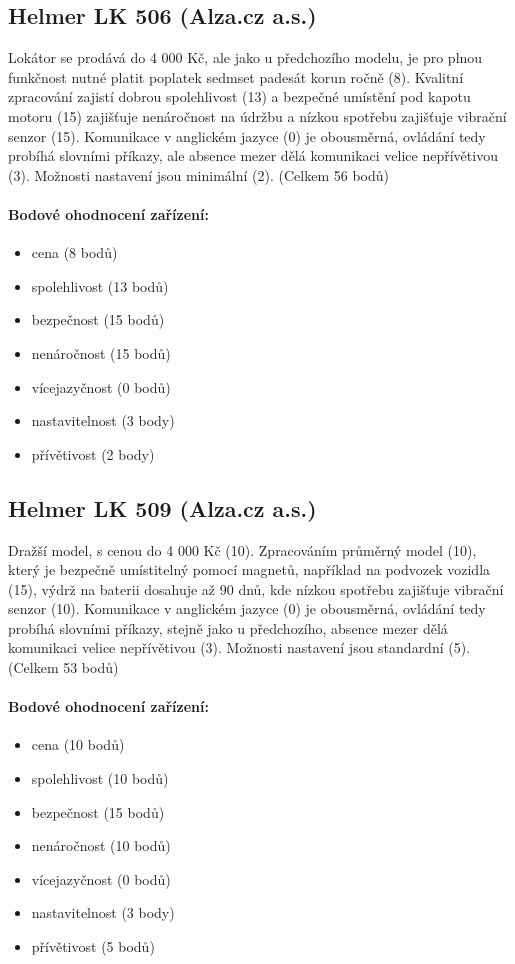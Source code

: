 \documentclass[FM,BP]{tulthesis}  %
\begin{document}
\subsection{Helmer LK 506 (Alza.cz a.s.)}
Lokátor se prodává do 4 000 Kč, ale jako u předchozího modelu, je pro plnou funkčnost nutné platit poplatek sedmset padesát korun ročně (8). Kvalitní zpracování zajistí dobrou spolehlivost (13) a bezpečné umístění pod kapotu motoru (15) zajišťuje nenáročnost na údržbu a nízkou spotřebu zajišťuje vibrační senzor (15). Komunikace v anglickém jazyce (0) je obousměrná, ovládání tedy probíhá slovními příkazy, ale absence mezer dělá komunikaci velice nepřívětivou (3). Možnosti nastavení jsou minimální (2). (Celkem 56 bodů)

\paragraph{Bodové ohodnocení zařízení:}
\begin{itemize}
\item cena (8 bodů)
\item spolehlivost (13 bodů)
\item bezpečnost (15 bodů)
\item nenáročnost (15 bodů)
\item vícejazyčnost (0 bodů)
\item nastavitelnost (3 body)
\item přívětivost (2 body)
\end{itemize}

\subsection{Helmer LK 509 (Alza.cz a.s.)}
Dražší model, s cenou do 4 000 Kč (10). Zpracováním průměrný model (10), který je bezpečně umístitelný pomocí magnetů, například na podvozek vozidla (15), výdrž na baterii dosahuje až 90 dnů, kde nízkou spotřebu zajišťuje vibrační senzor (10). Komunikace v anglickém jazyce (0) je obousměrná, ovládání tedy probíhá slovními příkazy, stejně jako u předchozího, absence mezer dělá komunikaci velice nepřívětivou (3). Možnosti nastavení jsou standardní (5). (Celkem 53 bodů)

\paragraph{Bodové ohodnocení zařízení:}
\begin{itemize}
\item cena (10 bodů)
\item spolehlivost (10 bodů)
\item bezpečnost (15 bodů)
\item nenáročnost (10 bodů)
\item vícejazyčnost (0 bodů)
\item nastavitelnost (3 body)
\item přívětivost (5 bodů)
\end{itemize}
\end{document}
